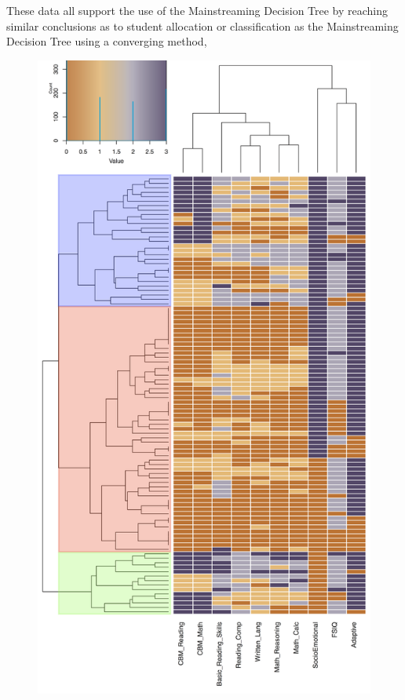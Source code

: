 \documentclass[twoside]{article}
\begin{document}
These data all support the use of the Mainstreaming Decision Tree by reaching similar conclusions as to student allocation or classification as the Mainstreaming Decision Tree using a converging method, 
%
%
%
%
\begin{figure}[htp!]
	\centering
	\includegraphics[width=\textwidth,height=\textheight]{Heatmap_Overall.png}
	\caption[Overall Predictive Results of Decision Algorithm]{\textit{           }}
	\label{fig6}
\end{figure}
%
%
%
%
\end{document}
